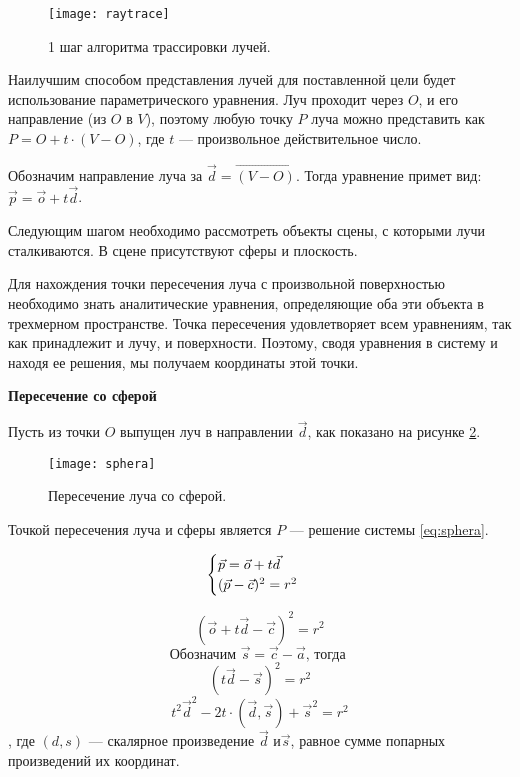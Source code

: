 \begin{figure}[H]
	\centering
	\texttt{[image: raytrace]}
	\caption{1 шаг алгоритма трассировки лучей. }
	\label{img:raytrace}
\end{figure}

Наилучшим способом представления лучей для поставленной цели будет использование параметрического уравнения. Луч проходит через $O$, и его направление (из $O$ в $V$), поэтому любую точку $P$ луча можно представить как $P = O + t \cdot (V - O)$, где $t$ --- произвольное действительное число. 

Обозначим направление луча за $\vec d = \overrightarrow{(V - O) }$. Тогда уравнение примет вид: $\vec p = \vec o + t\vec d$. 

Следующим шагом необходимо рассмотреть объекты сцены, с которыми лучи сталкиваются. В сцене присутствуют сферы и плоскость.

Для нахождения точки пересечения луча с произвольной поверхностью необходимо знать аналитические уравнения, определяющие оба эти объекта в трехмерном пространстве. Точка пересечения удовлетворяет всем уравнениям, так как принадлежит и лучу, и поверхности. Поэтому, сводя уравнения в систему и находя ее решения, мы получаем координаты этой точки. 

\textbf{Пересечение со сферой}

Пусть из точки $O$ выпущен луч в направлении $\vec d$, как показано на рисунке \ref{img:sphera}. 

\begin{figure}[H]
	\centering
	\texttt{[image: sphera]}
	\caption{Пересечение луча со сферой. }
	\label{img:sphera}
\end{figure}

Точкой пересечения луча и сферы является $P$ --- решение системы  \ref{eq:sphera}. 

\begin{equation}
	\centering
	\begin{cases}
   		\vec p = \vec o + t\vec d\\
   		(\vec p- \vec c)^2 = r^2
 	\end{cases}
	\label{eq:sphera}
\end{equation}

$$(\vec o + t\vec d - \vec c) ^ 2 = r^2$$
$$\text{Обозначим }\vec s = \vec c - \vec a  \text{, тогда }$$
$$(t\vec d -\vec s)^2 = r^2$$
$$t^2 \vec d^2  - 2  t \cdot (\vec d, \vec s) + \vec s ^2 = r^2$$, где $(d,s)$ — скалярное произведение $\vec d $ и$ \vec s$, равное сумме попарных произведений их координат.

